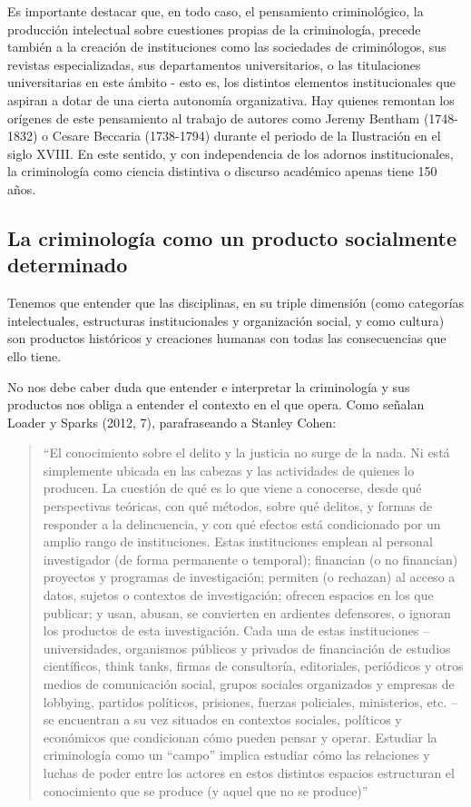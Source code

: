 \documentclass[
  spanish,
  letterpaper,
  DIV=11,
  numbers=noendperiod]{scrreprt}
\begin{document}
Es importante destacar que, en todo caso, el pensamiento criminológico,
la producción intelectual sobre cuestiones propias de la criminología,
precede también a la creación de instituciones como las sociedades de
criminólogos, sus revistas especializadas, sus departamentos
universitarios, o las titulaciones universitarias en este ámbito - esto
es, los distintos elementos institucionales que aspiran a dotar de una
cierta autonomía organizativa. Hay quienes remontan los orígenes de este
pensamiento al trabajo de autores como Jeremy Bentham (1748-1832) o
Cesare Beccaria (1738-1794) durante el periodo de la Ilustración en el
siglo XVIII. En este sentido, y con independencia de los adornos
institucionales, la criminología como ciencia distintiva o discurso
académico apenas tiene 150 años.

\subsection{La criminología como un producto socialmente
determinado}\label{la-criminologuxeda-como-un-producto-socialmente-determinado}

Tenemos que entender que las disciplinas, en su triple dimensión (como
categorías intelectuales, estructuras institucionales y organización
social, y como cultura) son productos históricos y creaciones humanas
con todas las consecuencias que ello tiene.

No nos debe caber duda que entender e interpretar la criminología y sus
productos nos obliga a entender el contexto en el que opera. Como
señalan Loader y Sparks (2012, 7), parafraseando a Stanley Cohen:

\begin{quote}
``El conocimiento sobre el delito y la justicia no surge de la nada. Ni
está simplemente ubicada en las cabezas y las actividades de quienes lo
producen. La cuestión de qué es lo que viene a conocerse, desde qué
perspectivas teóricas, con qué métodos, sobre qué delitos, y formas de
responder a la delincuencia, y con qué efectos está condicionado por un
amplio rango de instituciones. Estas instituciones emplean al personal
investigador (de forma permanente o temporal); financian (o no
financian) proyectos y programas de investigación; permiten (o rechazan)
al acceso a datos, sujetos o contextos de investigación; ofrecen
espacios en los que publicar; y usan, abusan, se convierten en ardientes
defensores, o ignoran los productos de esta investigación. Cada una de
estas instituciones -- universidades, organismos públicos y privados de
financiación de estudios científicos, think tanks, firmas de
consultoría, editoriales, periódicos y otros medios de comunicación
social, grupos sociales organizados y empresas de lobbying, partidos
políticos, prisiones, fuerzas policiales, ministerios, etc. -- se
encuentran a su vez situados en contextos sociales, políticos y
económicos que condicionan cómo pueden pensar y operar. Estudiar la
criminología como un ``campo'' implica estudiar cómo las relaciones y
luchas de poder entre los actores en estos distintos espacios
estructuran el conocimiento que se produce (y aquel que no se produce)''
\end{quote}
\end{document}
